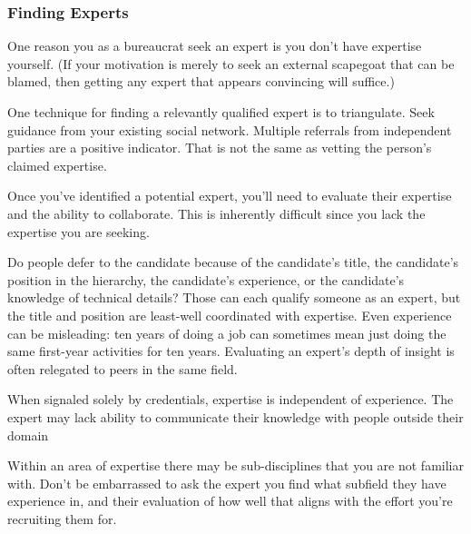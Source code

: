 \subsubsection*{Finding Experts}

One reason you as a bureaucrat seek an expert is you don't have expertise yourself. (If your motivation is merely to seek an external scapegoat that can be blamed, then getting any expert that appears convincing will suffice.)

One technique for finding a relevantly qualified expert is to triangulate. 
Seek guidance from your existing social network. Multiple referrals from independent parties are a positive indicator. That is not the same as vetting the person's claimed expertise.

Once you've identified a potential expert, you'll need to evaluate their expertise and the ability to collaborate. This is inherently difficult since you lack the expertise you are seeking.

Do people defer to the candidate because of the candidate's title, the candidate's position in the hierarchy, the candidate's experience, or the candidate's knowledge of technical details? Those can each qualify someone as an expert, but the title and position are least-well coordinated with expertise. Even experience can be misleading: ten years of doing a job can sometimes mean just doing the same first-year activities for ten years. %
Evaluating an expert's depth of insight is often relegated to peers in the same field. 

 

When signaled solely by credentials, expertise is independent of experience. The expert may lack ability to communicate their knowledge with people outside their domain

Within an area of expertise there may be sub-disciplines that you are not familiar with. Don't be embarrassed to ask the expert you find what subfield they have experience in, and their evaluation of how well that aligns with the effort you're recruiting them for.



